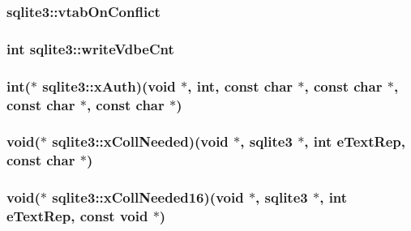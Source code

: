 \hypertarget{structsqlite3_acb957d1be62bc33b9f28201cd6dc4d5a}{
\subsubsection[{vtab\-On\-Conflict}]{ sqlite3\-::vtab\-On\-Conflict}}\label{structsqlite3_acb957d1be62bc33b9f28201cd6dc4d5a}
\hypertarget{structsqlite3_a632e51f8d35c1e8802639661e2fcd567}{
\subsubsection[{write\-Vdbe\-Cnt}]{\setlength{\rightskip}{0pt plus 5cm}int sqlite3\-::write\-Vdbe\-Cnt}}\label{structsqlite3_a632e51f8d35c1e8802639661e2fcd567}
\hypertarget{structsqlite3_a7eb4472cad41b37417fcc6d2cc0561fa}{
\subsubsection[{x\-Auth}]{\setlength{\rightskip}{0pt plus 5cm}int($\ast$ sqlite3\-::x\-Auth)(void $\ast$, int, const char $\ast$, const char $\ast$, const char $\ast$, const char $\ast$)}}\label{structsqlite3_a7eb4472cad41b37417fcc6d2cc0561fa}
\hypertarget{structsqlite3_ac43395ff160433e9811951232b1f6e63}{
\subsubsection[{x\-Coll\-Needed}]{\setlength{\rightskip}{0pt plus 5cm}void($\ast$ sqlite3\-::x\-Coll\-Needed)(void $\ast$, {\bf sqlite3} $\ast$, int e\-Text\-Rep, const char $\ast$)}}\label{structsqlite3_ac43395ff160433e9811951232b1f6e63}
\hypertarget{structsqlite3_a6401c0e45eb82417cae62b8c5a6425f6}{
\subsubsection[{x\-Coll\-Needed16}]{\setlength{\rightskip}{0pt plus 5cm}void($\ast$ sqlite3\-::x\-Coll\-Needed16)(void $\ast$, {\bf sqlite3} $\ast$, int e\-Text\-Rep, const void $\ast$)}}\label{structsqlite3_a6401c0e45eb82417cae62b8c5a6425f6}
